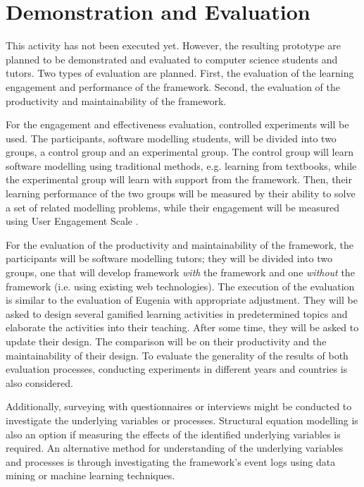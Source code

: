 \documentclass[12pt, a4paper]{report} \usepackage[titletoc]{appendix}
\begin{document}
\section{Demonstration and Evaluation}
This activity has not been executed yet. However, the resulting prototype are planned to be demonstrated and evaluated to computer science students and tutors. Two types of evaluation are planned. First, the evaluation of the learning engagement and performance of the framework. Second, the evaluation of the productivity and maintainability of the framework.

For the engagement and effectiveness evaluation, controlled experiments will be used. The participants, software modelling students, will be divided into two groups, a control group and an experimental group. The control group will learn software modelling using traditional methods, e.g. learning from textbooks, while the experimental group will learn with support from the framework. Then, their learning performance of the two groups will be measured by their ability to solve a set of related modelling problems, while their engagement will be measured using User Engagement Scale \cite{wiebe2014measuring}.  

For the evaluation of the productivity and maintainability of the framework, the participants will be software modelling tutors; they will be divided into two groups, one that will develop framework \emph{with} the framework and one \emph{without} the framework (i.e. using existing web technologies). The execution of the evaluation is similar to the evaluation of Eugenia \cite{kolovos2015eugenia} with appropriate adjustment. They will be asked to design several gamified learning activities in predetermined topics and elaborate the activities into their teaching. After some time, they will be asked to update their  design. The comparison will be on their productivity and the maintainability of their design. To evaluate the generality of the results of both evaluation processes, conducting experiments in different years and countries is also considered.

Additionally, surveying with questionnaires or interviews might be conducted to investigate the underlying variables or processes. Structural equation modelling \cite{hair2016primer} is also an option if measuring the effects of the identified underlying variables is required. An alternative method for understanding of the underlying variables and processes is through investigating the framework's event logs using data mining or machine learning techniques. 
\end{document}
